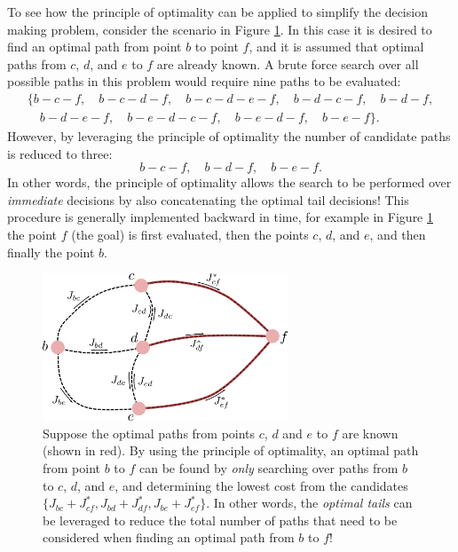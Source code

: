 To see how the principle of optimality can be applied to simplify the decision making problem, consider the scenario in Figure \ref{fig:princopt2}. In this case it is desired to find an optimal path from point $b$ to point $f$, and it is assumed that optimal paths from $c$, $d$, and $e$ to $f$ are already known. A brute force search over all possible paths in this problem would require nine paths to be evaluated:
\begin{equation*}
\begin{split}
\{b-c-f, \quad b-c-d-f, \quad b-c-d-e-f, \quad b-d-c-f, \quad b-d-f, \\
\quad b-d-e-f, \quad b-e-d-c-f, \quad b-e-d-f, \quad b-e-f \}.
\end{split}
\end{equation*}
However, by leveraging the principle of optimality the number of candidate paths is reduced to three:
\begin{equation*}
b-c-f, \quad b-d-f, \quad b-e-f.
\end{equation*}
In other words, the principle of optimality allows the search to be performed over \textit{immediate} decisions by also concatenating the optimal tail decisions! This procedure is generally implemented backward in time, for example in Figure \ref{fig:princopt2} the point $f$ (the goal) is first evaluated, then the points $c$, $d$, and $e$, and then finally the point $b$.
\begin{figure}[ht]
    \centering
    \includegraphics[width=0.65\textwidth]{tex/figs/ch20_figs/princopt2.png}
    \caption{Suppose the optimal paths from points $c$, $d$ and $e$ to $f$ are known (shown in red). By using the principle of optimality, an optimal path from point $b$ to $f$ can be found by \textit{only} searching over paths from $b$ to $c$, $d$, and $e$, and determining the lowest cost from the candidates $\{J_{bc} + J^*_{cf}, J_{bd} + J^*_{df}, J_{be} + J^*_{ef}\}$. In other words, the \textit{optimal tails} can be leveraged to reduce the total number of paths that need to be considered when finding an optimal path from $b$ to $f$!}
    \label{fig:princopt2}
\end{figure}

